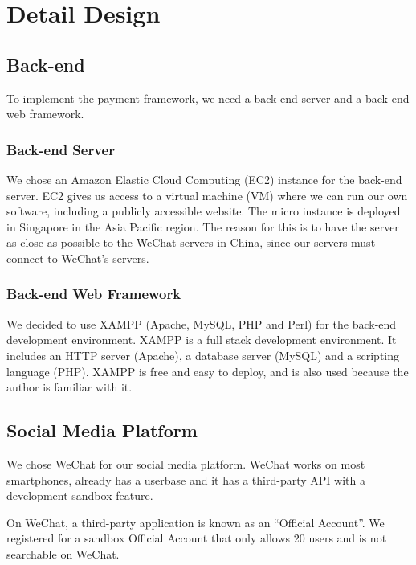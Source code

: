 \chapter{Detail Design}
\label{chp:Detail Design}


\section{Back-end}

To implement the payment framework, we need a back-end server and a back-end web framework. 

\subsection{Back-end Server}

We chose an Amazon Elastic Cloud Computing (EC2) instance for the back-end server. EC2 gives us access to a virtual machine (VM) where we can run our own software, including a publicly accessible website. The micro instance is deployed in Singapore in the Asia Pacific region. The reason for this is to have the server as close as possible to the WeChat servers in China, since our servers must connect to WeChat's servers.

\subsection{Back-end Web Framework}

We decided to use XAMPP (Apache, MySQL, PHP and Perl) for the back-end development environment. XAMPP is a full stack development environment. It includes an HTTP server (Apache), a database server (MySQL) and a scripting language (PHP). XAMPP is free and easy to deploy, and is also used because the author is familiar with it.

\section{Social Media Platform}

We chose WeChat for our social media platform. WeChat works on most smartphones, already has a userbase and it has a third-party API with a development sandbox feature. 

On WeChat, a third-party application is known as an ``Official Account''. We registered for a sandbox Official Account that only allows 20 users and is not searchable on WeChat.

